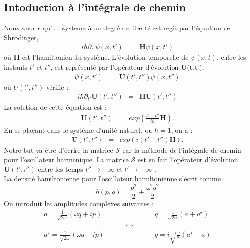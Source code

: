 \documentclass[a4paper,11pt]{article}
\theoremstyle{plain}
\theoremstyle{definition}
\theoremstyle{remark}
\numberwithin{equation}{section}
\numberwithin{equation}{subsection}
\numberwithin{figure}{section}
\begin{document}
\subsection{Intoduction à l'intégrale de chemin}

\noindent
Nous savons qu'un système à un degré de liberté est régit par l'équation de Shrödinger,
\begin{eqnarray}
 i \hbar \partial_{t'} \psi(x,t') &=& \textbf{H} \psi(x,t')
\end{eqnarray}
où $\textbf{H}$ est l'hamiltonien du système.
L'évolution temporelle de $\psi(x,t)$, entre les instants $t'$ et $t''$, est représenté par l'opérateur d'évolution $\textbf{U(t,t')}$,
\begin{eqnarray}
 \psi (x,t') &=& \textbf{U}(t',t'') \psi (x,t'')
\end{eqnarray}
où $U(t',t'')$ vérifie :
\begin{eqnarray}
  i \hbar \partial_{t'}  \textbf{U}(t',t'') &=& \textbf{H}  \textbf{U}(t',t'')
\end{eqnarray}
La solution de cette équation est :
\begin{eqnarray}
  \textbf{U}(t',t'') &=& exp \left( \frac{t'-t''}{i \hbar}  \textbf{H} \right).
\end{eqnarray}
En se plaçant dans le système d'unité naturel, où $\hbar=1$, on a :
\begin{eqnarray}
  \textbf{U}(t',t'') &=& exp \left( i (t'-t'') \textbf{H} \right).
\end{eqnarray}
Notre but va être d'écrire la matrice $\mathcal{S}$ par la méthode de l'intégrale de chemin pour l'oscillateur harmonique. 
La matrice $\mathcal{S}$ est en fait l'opérateur d'évolution $ \textbf{U}(t',t'') $  entre les temps $t'' \rightarrow - \infty$ 
et $t' \rightarrow - \infty$ . \\
La densité hamiltonienne pour l'oscillateur hamiltonienne s'écrit comme :
\begin{equation}
 h(p,q) = \frac{p^{2}}{2} + \frac{\omega^{2}q^{2}}{2}
\end{equation}
On introduit les amplitudes complexes suivantes :
\begin{eqnarray}
 a = \frac{1}{\sqrt{2 \omega}} \left( \omega q + i p \right)  \hspace{1cm}  &&  
\hspace{1cm} q =  \frac{1}{\sqrt{2 \omega}} \left( a + a^{\star} \right)\\
&\Longleftrightarrow&  \\
 a^{\star} = \frac{1}{\sqrt{2 \omega}} \left( \omega q - i p \right)   \hspace{1cm}  &&  
\hspace{1cm} q = i \sqrt{\frac{\omega}{2}} \left( a^{\star} - a \right)\\
\end{eqnarray}
\end{document}
